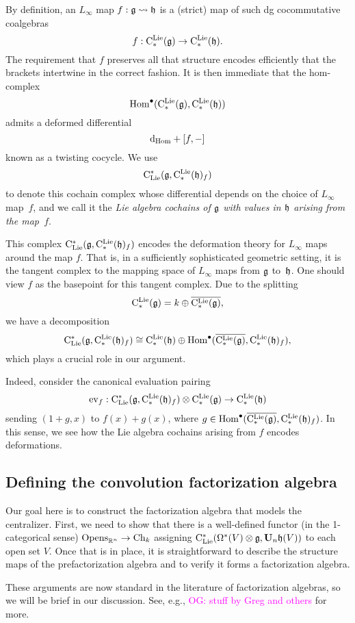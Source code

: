 \documentclass[11pt]{amsart}
\numberwithin{equation}{section}
\def\owen{\textcolor{magenta}{OG: }\textcolor{magenta}}
\begin{document}
By definition, an $L_\infty$ map $f: \mathfrak g \rightsquigarrow \mathfrak h$ is a (strict) map of such dg cocommutative coalgebras
\[
f: {\rm C}^{\rm Lie}_*(\mathfrak g) \to {\rm C}^{\rm Lie}_*(\mathfrak h).
\]
The requirement that $f$ preserves all that structure encodes efficiently that the brackets intertwine in the correct fashion.
It is then immediate that the hom-complex
\[
{\rm Hom}^\bullet ({\rm C}^{\rm Lie}_*(\mathfrak g), {\rm C}^{\rm Lie}_*(\mathfrak h))
\]
admits a deformed differential
\[
{\rm d}_{\rm Hom} + [f,-]
\]
known as a twisting cocycle.
We use 
\[
{\rm C}_{\rm Lie}^*(\mathfrak g,{\rm C}^{\rm Lie}_*(\mathfrak h)_f)
\]
to denote this cochain complex whose differential depends on the choice of $L_\infty$ map~$f$,
and we call it the {\em Lie algebra cochains of $\mathfrak g$ with values in $\mathfrak h$ arising from the map~$f$}.

This complex ${\rm C}_{\rm Lie}^*(\mathfrak g,{\rm C}^{\rm Lie}_*(\mathfrak h)_f)$ encodes the deformation theory for $L_\infty$ maps around the map $f$.
That is, in a sufficiently sophisticated geometric setting, it is the tangent complex to the mapping space of $L_\infty$ maps from $\mathfrak g$ to~$\mathfrak h$.
One should view $f$ as the basepoint for this tangent complex.
Due to the splitting
\[
{\rm C}^{\rm Lie}_*(\mathfrak g) = k \oplus \overline{{\rm C}^{\rm Lie}_*(\mathfrak g)},
\]
we have a decomposition
\[
{\rm C}_{\rm Lie}^*(\mathfrak g,{\rm C}^{\rm Lie}_*(\mathfrak h)_f) \cong {\rm C}^{\rm Lie}_*(\mathfrak h) \oplus {\rm Hom}^\bullet(\overline{{\rm C}^{\rm Lie}_*(\mathfrak g)}, {\rm C}^{\rm Lie}_*(\mathfrak h)_f),
\]
which plays a crucial role in our argument.

Indeed, consider the canonical evaluation pairing
\[
{\rm ev}_{f}: {\rm C}_{\rm Lie}^*(\mathfrak g,{\rm C}^{\rm Lie}_*(\mathfrak h)_f) \otimes {\rm C}^{\rm Lie}_*(\mathfrak g) \to {\rm C}^{\rm Lie}_*(\mathfrak h)
\]
sending $(1 + g, x)$ to $f(x) + g(x)$, where $g \in {\rm Hom}^\bullet(\overline{{\rm C}^{\rm Lie}_*(\mathfrak g)}, {\rm C}^{\rm Lie}_*(\mathfrak h)_f)$.
In this sense, we see how the Lie algebra cochains arising from $f$ encodes deformations.

\subsection{Defining the convolution factorization algebra}

Our goal here is to construct the factorization algebra that models the centralizer.
First, we need to show that there is a well-defined functor (in the 1-categorical sense) ${\rm Opens}_{\mathbb R^n} \to {\rm Ch}_k$ assigning ${\rm C}_{\rm Lie}^*(\Omega^*(V) \otimes \mathfrak g, \mathbf U_n \mathfrak h(V))$ to each open set $V$.
Once that is in place, it is straightforward to describe the structure maps of the prefactorization algebra and to verify it forms a factorization algebra.

\begin{rmk}
These arguments are now standard in the literature of factorization algebras, so we will be brief in our discussion.
See, e.g., \cite{CG1} \owen{stuff by Greg and others} for more.
\end{rmk}
\end{document}
